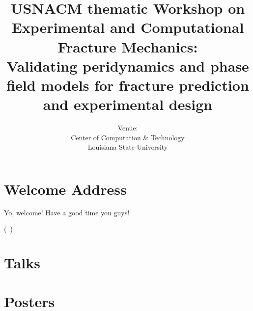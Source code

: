 \documentclass[12pt]{book}
\title{USNACM thematic Workshop on Experimental and Computational Fracture Mechanics: \\
	\large Validating peridynamics and phase field models for fracture prediction and experimental design}
\author{Venue: \\ Center of Computation \& Technology \\ Louisiana State University}
\newenvironment{conf-abstract}[4][]{
  \needspace{10\baselineskip}
  \begin{center}
    { \renewcommand\textsuperscript[1]{}
      \phantomsection\addcontentsline{toc}{section}
      {\texorpdfstring{#2 (\emph{#3})}{#2 (#3)}}
    }
    {{\large\bfseries #2}\marginnote{#1}\par}
    \medskip
    {#3\par}
    \smallskip
    {\small #4\par}
  \end{center}
}{%
  \bigskip
  \hrule
  \bigskip
}
\newcommand{\indexauthors}[1]{%
  \forcsvlist{\index}{#1}
}
\begin{document}
\frontmatter

\maketitle



\chapter{Welcome Address}


Yo, welcome! Have a good time you guys!

(~)

\begin{sidewaysfigure}

\end{sidewaysfigure}


\tableofcontents

\mainmatter
\chapter{Talks}

{
\begin{conf-abstract}[\datum\\\time]
{\title}
{\first~ \last}
{\affiliation}
\indexauthors{\last!\first}
\end{conf-abstract}
}

\chapter{Posters}




%
\end{document}
